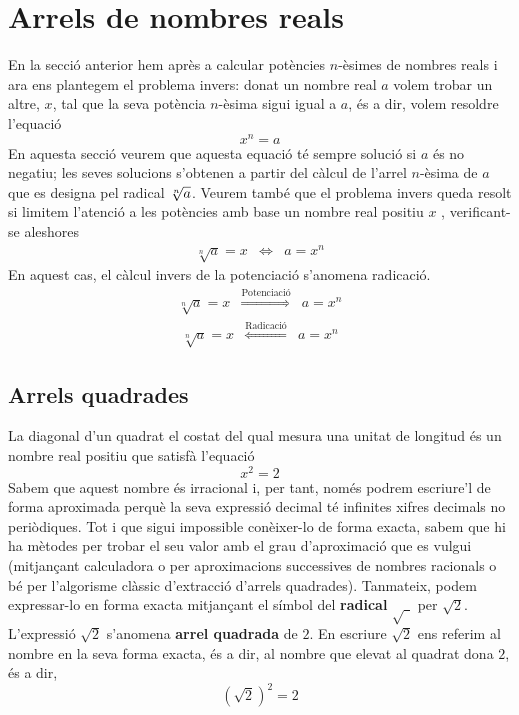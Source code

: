 \section{Arrels de nombres reals}

En la secció anterior hem après a calcular potències $n$-èsimes de
nombres reals i ara ens plantegem el problema invers: donat un nombre real $a$ volem trobar un altre, $x$, tal que la seva potència $n$-èsima sigui
igual a $a$, és a dir, volem resoldre l’equació%
\begin{equation*}
x^{n}=a
\end{equation*}%
En aquesta secció veurem que aquesta equació té sempre solució
si $a$ és no negatiu; les seves solucions s’obtenen a partir del càlcul
de l’arrel $n$-èsima de $a$ que es designa pel radical $\sqrt[n]{%
a}$. Veurem també que el problema invers queda resolt si limitem
l’atenció a les potències amb base un nombre real positiu $x$%
, verificant-se aleshores%
\begin{equation*}
\begin{array}{ccc}
\sqrt[n]{a}=x & \Longleftrightarrow & a=x^{n}%
\end{array}%
\end{equation*}%
En aquest cas, el càlcul invers de la potenciació s’anomena
radicació.%
\begin{equation*}
\begin{array}{ccc}
\sqrt[n]{a}=x & \overset{\text{Potenciació}}{\Longrightarrow } & a=x^{n}%
\end{array}%
\end{equation*}%
\begin{equation*}
\begin{array}{ccc}
\sqrt[n]{a}=x & \overset{\text{Radicació}}{\Longleftarrow } & a=x^{n}%
\end{array}%
\end{equation*}

\subsection{Arrels quadrades}

La diagonal d’un quadrat el costat del qual mesura una unitat de longitud és un nombre real positiu que satisfà l’equació%
\begin{equation*}
x^{2}=2
\end{equation*}%
Sabem que aquest nombre és irracional i, per tant, només podrem
escriure’l de forma aproximada perquè la seva expressió decimal té
infinites xifres decimals no periòdiques. Tot i que sigui impossible conèixer-lo
de forma exacta, sabem que hi ha mètodes per trobar el seu valor amb el
grau d’aproximació que es vulgui (mitjançant calculadora o per
aproximacions successives de nombres racionals o bé per l’algorisme clàssic d’extracció d’arrels quadrades). Tanmateix, podem
expressar-lo en forma exacta mitjançant el símbol del \textbf{radical} $%
\sqrt{~\ }$ per $\sqrt{2}$. L’expressió $\sqrt{2}$ s’anomena \textbf{arrel quadrada} de $2$. En escriure $\sqrt{2}$ ens referim al nombre
en la seva forma exacta, és a dir, al nombre que elevat al quadrat dona $2$,
és a dir,%
\begin{equation*}
\left( \sqrt{2}\right) ^{2}=2
\end{equation*}

